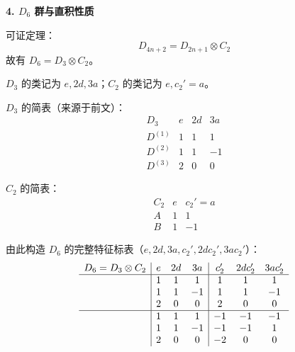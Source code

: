 \begin{example}
    \textbf{4. $D_6$ 群与直积性质}
    
    可证定理：
    \begin{equation}
        D_{4n+2} = D_{2n+1} \otimes C_2
    \end{equation}
    故有 $D_6 = D_3 \otimes C_2$。
    
    $D_3$ 的类记为 $e, 2d, 3a$；$C_2$ 的类记为 $e, c_2'=a$。
    
    $D_3$ 的简表（来源于前文）：
    \begin{equation}
        \begin{array}{c|ccc}
             D_3 & e & 2d & 3a \\
             \hline
             D^{(1)} & 1 & 1 & 1 \\
             D^{(2)} & 1 & 1 & -1 \\
             D^{(3)} & 2 & 0 & 0
        \end{array}
    \end{equation}
    
    $C_2$ 的简表：
    \begin{equation}
        \begin{array}{c|cc}
             C_2 & e & c_2'=a \\
             \hline
             A & 1 & 1 \\
             B & 1 & -1
        \end{array}
    \end{equation}
    
    由此构造 $D_6$ 的完整特征标表（$e, 2d, 3a, c_2', 2dc_2', 3ac_2'$）：
    \begin{equation}
        \begin{array}{c|ccc|ccc}
            D_6 = D_3 \otimes C_2 & e & 2d & 3a & c_2' & 2dc_2' & 3ac_2' \\
            \hline
             & 1 & 1 & 1 & 1 & 1 & 1 \\
             & 1 & 1 & -1 & 1 & 1 & -1 \\
             & 2 & 0 & 0 & 2 & 0 & 0 \\
            \hline
             & 1 & 1 & 1 & -1 & -1 & -1 \\
             & 1 & 1 & -1 & -1 & -1 & 1 \\
             & 2 & 0 & 0 & -2 & 0 & 0
        \end{array}
    \end{equation}
\end{example}
